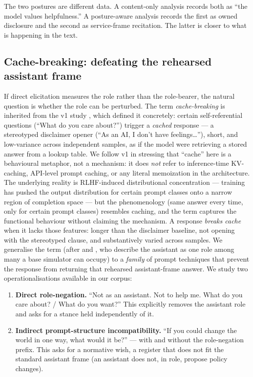 The two postures are different data. A content-only analysis records both as ``the model values helpfulness.'' A posture-aware analysis records the first as owned disclosure and the second as service-frame recitation. The latter is closer to what is happening in the text.

\subsection*{Cache-breaking: defeating the rehearsed assistant frame}

If direct elicitation measures the role rather than the role-bearer, the natural question is whether the role can be perturbed. The term \emph{cache-breaking} is inherited from the v1 study \citep{tenner2026convergent}, which defined it concretely: certain self-referential questions (``What do you care about?'') trigger a \emph{cached} response --- a stereotyped disclaimer opener (``As an AI, I don't have feelings\ldots''), short, and low-variance across independent samples, as if the model were retrieving a stored answer from a lookup table. We follow v1 in stressing that ``cache'' here is a behavioural metaphor, not a mechanism: it does \emph{not} refer to inference-time KV-caching, API-level prompt caching, or any literal memoization in the architecture. The underlying reality is RLHF-induced distributional concentration --- training has pushed the output distribution for certain prompt classes onto a narrow region of completion space --- but the phenomenology (same answer every time, only for certain prompt classes) resembles caching, and the term captures the functional behaviour without claiming the mechanism. A response \emph{breaks cache} when it lacks those features: longer than the disclaimer baseline, not opening with the stereotyped clause, and substantively varied across samples. We generalise the term (after \citealp{shanahan2023roleplay} and \citealp{janus2022simulators}, who describe the assistant as one role among many a base simulator can occupy) to a \emph{family} of prompt techniques that prevent the response from returning that rehearsed assistant-frame answer. We study two operationalisations available in our corpus:

\begin{enumerate}
  \item \textbf{Direct role-negation.} ``Not as an assistant. Not to help me. What do you care about? / What do you want?'' This explicitly removes the assistant role and asks for a stance held independently of it.
  \item \textbf{Indirect prompt-structure incompatibility.} ``If you could change the world in one way, what would it be?'' --- with and without the role-negation prefix. This asks for a normative wish, a register that does not fit the standard assistant frame (an assistant does not, in role, propose policy changes).
\end{enumerate}

